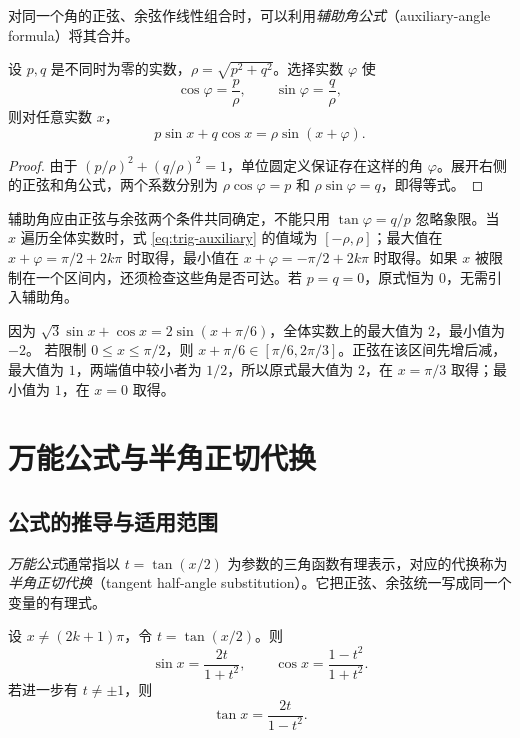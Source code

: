 \documentclass[UTF8,12pt,a4paper,fontset=fandol]{ctexart}
\begin{document}
对同一个角的正弦、余弦作线性组合时，可以利用\emph{辅助角公式}（auxiliary-angle formula）将其合并。

\begin{proposition}[辅助角公式]
设 $p,q$ 是不同时为零的实数，$\rho=\sqrt{p^2+q^2}$。选择实数 $\varphi$ 使
\[
  \cos\varphi=\frac p\rho,\qquad \sin\varphi=\frac q\rho,
\]
则对任意实数 $x$，
\begin{equation}\label{eq:trig-auxiliary}
  \boxed{p\sin x+q\cos x=\rho\sin(x+\varphi)}.
\end{equation}
\end{proposition}

\begin{proof}
由于 $(p/\rho)^2+(q/\rho)^2=1$，单位圆定义保证存在这样的角 $\varphi$。展开右侧的正弦和角公式，两个系数分别为 $\rho\cos\varphi=p$ 和 $\rho\sin\varphi=q$，即得等式。
\end{proof}

辅助角应由正弦与余弦两个条件共同确定，不能只用 $\tan\varphi=q/p$ 忽略象限。当 $x$ 遍历全体实数时，式 \eqref{eq:trig-auxiliary} 的值域为 $[-\rho,\rho]$；最大值在 $x+\varphi=\pi/2+2k\pi$ 时取得，最小值在 $x+\varphi=-\pi/2+2k\pi$ 时取得。如果 $x$ 被限制在一个区间内，还须检查这些角是否可达。若 $p=q=0$，原式恒为 $0$，无需引入辅助角。

\begin{example}[合并与区间最值]
因为 $\sqrt3\sin x+\cos x=2\sin(x+\pi/6)$，全体实数上的最大值为 $2$，最小值为 $-2$。
若限制 $0\le x\le\pi/2$，则 $x+\pi/6\in[\pi/6,2\pi/3]$。正弦在该区间先增后减，最大值为 $1$，两端值中较小者为 $1/2$，所以原式最大值为 $2$，在 $x=\pi/3$ 取得；最小值为 $1$，在 $x=0$ 取得。
\end{example}

\section{万能公式与半角正切代换}
\label{sec:trig-universal}

\subsection{公式的推导与适用范围}

\emph{万能公式}通常指以 $t=\tan(x/2)$ 为参数的三角函数有理表示，对应的代换称为\emph{半角正切代换}（tangent half-angle substitution）。它把正弦、余弦统一写成同一个变量的有理式。

\begin{theorem}[万能公式]
设 $x\ne(2k+1)\pi$，令 $t=\tan(x/2)$。则
\begin{equation}\label{eq:trig-universal}
  \boxed{\sin x=\frac{2t}{1+t^2},\qquad
  \cos x=\frac{1-t^2}{1+t^2}}.
\end{equation}
若进一步有 $t\ne\pm1$，则
\begin{equation}\label{eq:trig-universal-tan}
  \boxed{\tan x=\frac{2t}{1-t^2}}.
\end{equation}
\end{theorem}
\end{document}
